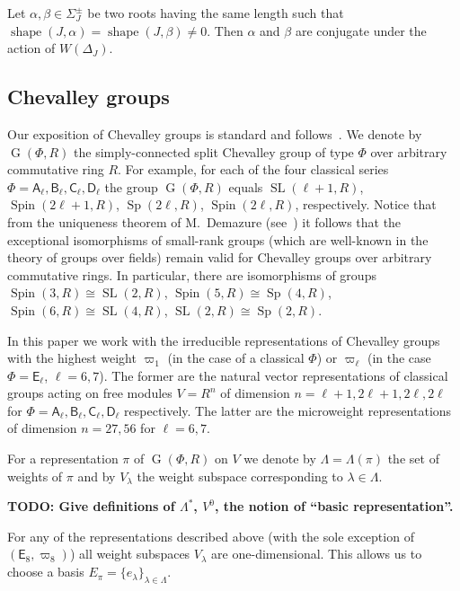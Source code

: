 \documentclass[12pt]{amsart}
\numberwithin{equation}{section}
\theoremstyle{definition}
\DeclareMathOperator{\G}{G}
\DeclareMathOperator{\SL}{SL}
\DeclareMathOperator{\Sp}{Sp}
\DeclareMathOperator{\shape}{shape}
\DeclareMathOperator{\Spin}{Spin}
\newcommand{\rA}{\mathsf{A}}
\newcommand{\rB}{\mathsf{B}}
\newcommand{\rC}{\mathsf{C}}
\newcommand{\rD}{\mathsf{D}}
\newcommand{\rE}{\mathsf{E}}
\begin{document}
\begin{lemma}\label{lemma:abs}
Let $\alpha, \beta \in \Sigma^\pm_J$ be two roots having the same length such that $\shape(J,\alpha)=\shape(J,\beta)\neq 0$.
Then $\alpha$ and $\beta$ are conjugate under the action of $W(\Delta_J)$.
\end{lemma}

\subsection{Chevalley groups}
Our exposition of Chevalley groups is standard and follows~\cite{Ta, S, St78, VP, Va86}.
We denote by $\G(\Phi, R)$ the simply-connected split Chevalley group of type $\Phi$ over arbitrary commutative ring $R$. For example, for each of the four classical series $\Phi=\rA_\ell, \rB_\ell, \rC_\ell, \rD_\ell$
the group $\G(\Phi, R)$ equals $\SL(\ell+1, R)$, $\Spin(2\ell+1, R)$, $\Sp(2\ell, R)$, $\Spin(2\ell, R)$, respectively. Notice that from the uniqueness theorem of M.~Demazure (see~\cite[Corollaire~5.2]{SGA3}) 
it follows that the exceptional isomorphisms of small-rank groups (which are well-known in the theory of groups over fields) remain valid for Chevalley groups over arbitrary commutative rings.
In particular, there are isomorphisms of groups $\Spin(3,R)\cong\SL(2,R)$, $\Spin(5, R)\cong \Sp(4, R)$, $\Spin(6, R)\cong\SL(4, R)$, $\SL(2, R)\cong \Sp(2, R)$.  

In this paper we work with the irreducible representations of Chevalley groups with the highest weight
$\varpi_1$ (in the case of a classical $\Phi$) or $\varpi_\ell$ (in the case $\Phi=\rE_\ell$, $\ell=6,7$). The former are the natural vector representations of classical groups acting on free modules $V=R^n$ of dimension $n=\ell+1, 2\ell+1, 2\ell,2\ell$ for $\Phi=\rA_\ell,\rB_\ell,\rC_\ell,\rD_\ell$ respectively.
The latter are the microweight representations of dimension $n=27, 56$ for $\ell=6,7$.

For a representation $\pi$ of $\G(\Phi, R)$ on $V$ we denote by $\Lambda=\Lambda(\pi)$ the set of weights of $\pi$ and by $V_\lambda$ the weight subspace corresponding to $\lambda\in\Lambda$.

\textbf{TODO: Give definitions of $\Lambda^*$, $V^0$, the notion of ``basic representation''. }

For any of the representations described above (with the sole exception of $(\rE_8, \varpi_8)$) all weight subspaces $V_\lambda$ are one-dimensional. 
This allows us to choose a basis $E_\pi=\{e_\lambda\}_{\lambda\in\Lambda}$.
\end{document}
